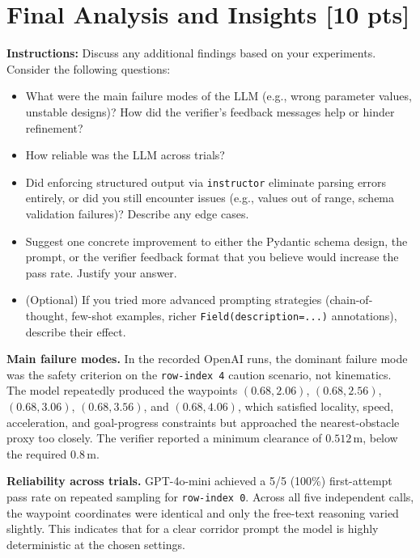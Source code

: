 \documentclass[12pt]{article}
\begin{document}
\newpage
\section{Final Analysis and Insights [10 pts]}

\noindent\textbf{Instructions:} Discuss any additional findings based on your experiments.
Consider the following questions:
\begin{itemize}
  \item What were the main failure modes of the LLM (e.g., wrong parameter values, unstable
    designs)? How did the verifier's feedback messages help or hinder refinement?
  \item How reliable was the LLM across trials?
  \item Did enforcing structured output via \texttt{instructor} eliminate parsing errors
    entirely, or did you still encounter issues (e.g., values out of range, schema validation
    failures)? Describe any edge cases.
  \item Suggest one concrete improvement to either the Pydantic schema design, the prompt, or
    the verifier feedback format that you believe would increase the pass rate. Justify your
    answer.
  \item (Optional) If you tried more advanced prompting strategies (chain-of-thought, few-shot
    examples, richer \texttt{Field(description=...)} annotations), describe their effect.
\end{itemize}

\bigskip
\noindent\textbf{Main failure modes.}
In the recorded OpenAI runs, the dominant failure mode was the safety criterion on the
\texttt{row-index 4} caution scenario, not kinematics. The model repeatedly produced the
waypoints $(0.68, 2.06)$, $(0.68, 2.56)$, $(0.68, 3.06)$, $(0.68, 3.56)$, and $(0.68, 4.06)$,
which satisfied locality, speed, acceleration, and goal-progress constraints but approached the
nearest-obstacle proxy too closely. The verifier reported a minimum clearance of
$0.512\,\text{m}$, below the required $0.8\,\text{m}$.

\medskip
\noindent\textbf{Reliability across trials.}
GPT-4o-mini achieved a 5/5 (100\%) first-attempt pass rate on repeated sampling for
\texttt{row-index 0}. Across all five independent calls, the waypoint coordinates were identical
and only the free-text reasoning varied slightly. This indicates that for a clear corridor prompt
the model is highly deterministic at the chosen settings.
\end{document}
